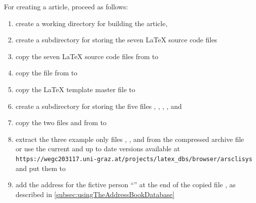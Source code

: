 For creating a \singledoc article, proceed as follows:
\begin{enumerate}
\item create a working directory for building the \wegcLaTeX{} \singledoc
  article, \EG{} 

\item create a subdirectory 
  for storing the seven \LaTeX{} source code files

\item copy the seven \LaTeX{} source code files from
   to

\item copy the  file  from
   to

\item copy the \LaTeX{} template master file
  to 

\item create a subdirectory 
  for storing the five files , ,
  , , and 

\item copy the two files  and  from
   to \\

\item extract the three example only files , , and
   from the compressed archive file \\
  or use the current and up to date versions available at 
  \nolinkurl{https://wegc203117.uni-graz.at/projects/latex_dbs/browser/arsclisys}
  and put them to \\

\item add the address for the fictive person ``'' at the end of
  the copied file , as described in
  \autoref{subsec:usingTheAddressBookDatabase}


\end{enumerate}
